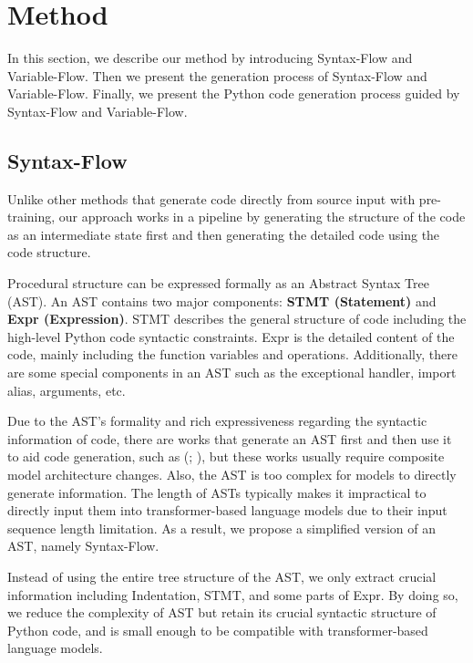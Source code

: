 \documentclass[11pt]{article}
\begin{document}
\section{Method}
In this section, we describe our method by introducing Syntax-Flow and Variable-Flow. Then we present the generation process of Syntax-Flow and Variable-Flow. Finally, we present the Python code generation process guided by Syntax-Flow and Variable-Flow. 
\subsection{Syntax-Flow} 
Unlike other methods that generate code directly from source input with pre-training, our approach works in a pipeline by generating the structure of the code as an intermediate state first and then generating the detailed code using the code structure. 





Procedural structure can be expressed formally as an Abstract Syntax Tree (AST). An AST contains two major components: \textbf{STMT (Statement)} and \textbf{Expr (Expression)}. STMT describes the general structure of code including the high-level Python code syntactic constraints. Expr is the detailed content of the code, mainly including the function variables and operations. Additionally, there are some special components in an AST such as the exceptional handler, import alias, arguments, etc.







Due to the AST's formality and rich expressiveness regarding the syntactic information of code, there are works that generate an AST first and then use it to aid code generation, such as (\citealp[]{Yin2017ASN}; \citealp[]{Ling2016LatentPN}), but these works usually require composite model architecture changes. Also, the AST is too complex for models to directly generate information. The length of ASTs typically makes it impractical to directly input them into transformer-based language models due to their input sequence length limitation. As a result, we propose a simplified version of an AST, namely Syntax-Flow.

Instead of using the entire tree structure of the AST, we only extract crucial information including Indentation, STMT, and some parts of Expr. By doing so, we reduce the complexity of AST but retain its crucial syntactic structure of Python code, and is small enough to be compatible with transformer-based language models.
\end{document}
